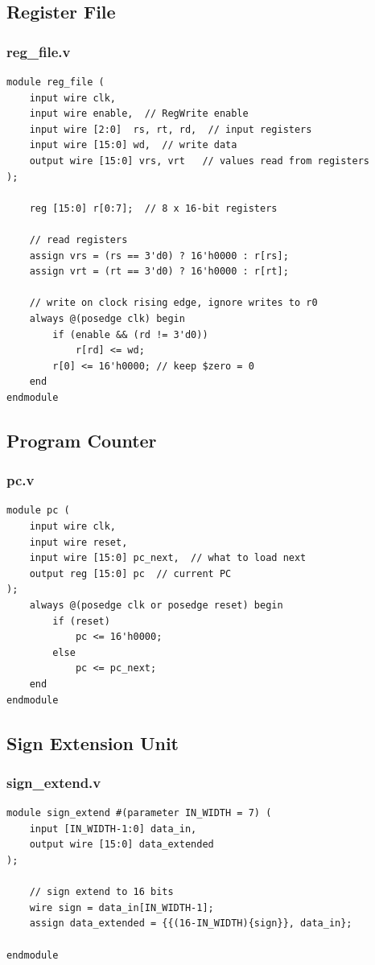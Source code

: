 \documentclass[12pt]{report}
\begin{document}
\subsection{Register File}
\subsubsection{reg\_file.v}
\begin{lstlisting}
module reg_file (
    input wire clk,
    input wire enable,  // RegWrite enable
    input wire [2:0]  rs, rt, rd,  // input registers
    input wire [15:0] wd,  // write data
    output wire [15:0] vrs, vrt   // values read from registers
);
  
    reg [15:0] r[0:7];  // 8 x 16-bit registers

    // read registers
    assign vrs = (rs == 3'd0) ? 16'h0000 : r[rs];
    assign vrt = (rt == 3'd0) ? 16'h0000 : r[rt];

    // write on clock rising edge, ignore writes to r0
    always @(posedge clk) begin
        if (enable && (rd != 3'd0))
            r[rd] <= wd;
        r[0] <= 16'h0000; // keep $zero = 0
    end
endmodule
\end{lstlisting}

\subsection{Program Counter}
\subsubsection{pc.v}
\begin{lstlisting}
module pc (
    input wire clk,
    input wire reset,
    input wire [15:0] pc_next,  // what to load next
    output reg [15:0] pc  // current PC
);
    always @(posedge clk or posedge reset) begin
        if (reset)
            pc <= 16'h0000;
        else
            pc <= pc_next;
    end
endmodule
\end{lstlisting}

\subsection{Sign Extension Unit}
\subsubsection{sign\_extend.v}
\begin{lstlisting}
module sign_extend #(parameter IN_WIDTH = 7) (
    input [IN_WIDTH-1:0] data_in,
    output wire [15:0] data_extended
);

    // sign extend to 16 bits
    wire sign = data_in[IN_WIDTH-1];
    assign data_extended = {{(16-IN_WIDTH){sign}}, data_in};
    
endmodule
\end{lstlisting}
\end{document}
